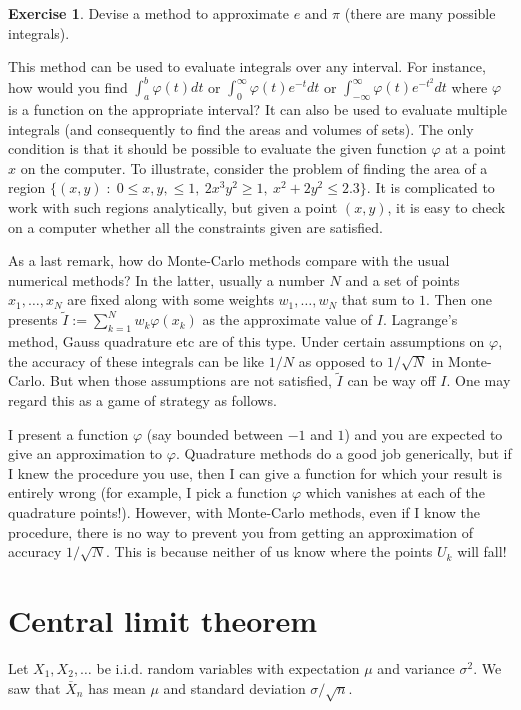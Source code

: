 \documentclass[preprint,  11pt]{amsart}
\theoremstyle{plain} %
\theoremstyle{definition} %
\newtheorem{exercise}[theorem]{Exercise}
\begin{document}
\begin{exercise} Devise a method to approximate $e$ and $\pi$ (there are many possible integrals). 
\end{exercise} 

This method can be used to evaluate integrals over any interval. For instance, how would you find $\int_{a}^{b}\varphi(t) dt$ or $\int_{0}^{\infty}\varphi(t) e^{-t}dt$ or $\int_{-\infty}^{\infty}\varphi(t)e^{-t^{2}}dt$ where  $\varphi$ is a function on the appropriate interval? It can also be used to evaluate multiple integrals (and consequently to find the areas and volumes of sets). The only condition is that it should be possible to evaluate the given function $\varphi$ at a point $x$ on the computer. To illustrate, consider the problem of finding the area of a region $\{(x,y){\; : \;} 0\le x,y, \le1, \ 2x^{3}y^{2}\ge 1, \ x^{2}+2y^{2}\le 2.3 \}$. It is complicated to work with such regions analytically, but given a point $(x,y)$, it is easy to check on a computer whether all the constraints given are satisfied. 

As a last remark, how do Monte-Carlo methods compare with the usual numerical methods? In the latter, usually a number $N$ and a set of points $x_{1},\ldots ,x_{N}$ are fixed along with some weights $w_{1},\ldots ,w_{N}$ that sum to $1$. Then one presents $\tilde{I}:=\sum_{k=1}^{N}w_{k}\varphi(x_{k})$ as the approximate value of $I$. Lagrange's method, Gauss quadrature etc are of this type. Under certain assumptions on $\varphi$, the accuracy of these integrals can be like $1/N$ as opposed to $1/\sqrt{N}$ in Monte-Carlo. But when those assumptions are not satisfied, $\tilde{I}$ can be way off $I$. One may regard this as a game of strategy as follows.

I present a function $\varphi$ (say bounded between $-1$ and $1$)  and you are expected to give an approximation to $\varphi$. Quadrature methods do a good job generically, but if I knew the procedure you use, then I can give a function for which your result is entirely wrong (for example, I pick a function $\varphi$ which vanishes at each of the quadrature points!). However, with Monte-Carlo methods, even if I know the procedure, there is no way to prevent you from getting an approximation of accuracy $1/\sqrt{N}$. This is because neither of us know where the points $U_{k}$ will fall!


\section{Central limit theorem}
Let $X_{1},X_{2},\ldots$ be i.i.d. random variables with expectation $\mu$ and variance ${\sigma}^{2}$. We saw that $\overline{X}_{n}$ has mean $\mu$ and standard deviation ${\sigma}/\sqrt{n}$. 
\end{document}
